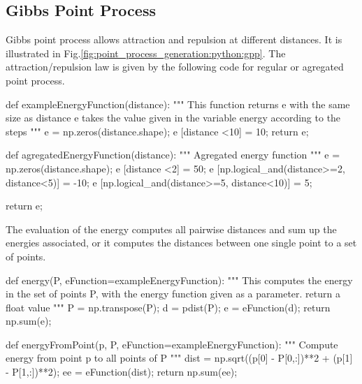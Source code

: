 \subsection{Gibbs Point Process}
Gibbs point process allows attraction and repulsion at different distances. It is illustrated in Fig.\ref{fig:point_process_generation:python:gpp}. The attraction/repulsion law is given by the following code for regular or agregated point process.

\begin{python}    
def exampleEnergyFunction(distance):
    """ This function returns e with the same size as distance
    e takes the value given in the variable energy according to the steps
    """
    e = np.zeros(distance.shape);
    e [distance <10] = 10;
    return e;

def agregatedEnergyFunction(distance):
    """ 
    Agregated energy function
    """
    e = np.zeros(distance.shape);
    e [distance <2] = 50;
    e [np.logical_and(distance>=2, distance<5)] = -10;
    e [np.logical_and(distance>=5, distance<10)] = 5;

    return e;
\end{python}

The evaluation of the energy computes all pairwise distances and sum up the energies associated, or it computes the distances between one single point to a set of points.

\begin{python}
def energy(P, eFunction=exampleEnergyFunction):
    """
    This computes the energy in the set of points P, with the energy function
    given as a parameter.
    return a float value
    """
    P = np.transpose(P);
    d = pdist(P);
    e = eFunction(d);
    return np.sum(e);
    
def energyFromPoint(p, P, eFunction=exampleEnergyFunction):
    """
    Compute energy from point p to all points of P
    """
    dist = np.sqrt((p[0] - P[0,:])**2 + (p[1] - P[1,:])**2);
    ee = eFunction(dist);
    return np.sum(ee);
\end{python}

